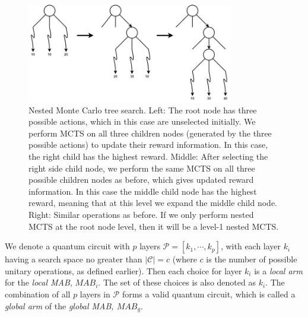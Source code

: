 \documentclass[a4paper,onecolumn,11pt]{quantumarticle}
\begin{document}
\begin{figure}[H]
  \centering
  \includegraphics[width=0.8\textwidth]{Figures/nmcs.png}
  \caption{Nested Monte Carlo tree search. Left: The root node has three possible actions, which in this case are unselected initially. We perform MCTS on all three children nodes (generated by the three possible actions) to update their reward information. In this case, the right child has the highest reward. Middle: After selecting the right side child node, we perform the same MCTS on all three possible children nodes as before, which gives updated reward information. In this case the middle child node has the highest reward, meaning that at this level we expand the middle child node. Right: Similar operations as before. If we only perform nested MCTS at the root node level, then it will be a level-1 nested MCTS.}
  \label{fig:nestedmcts}
\end{figure}



We denote a quantum circuit with $p$ layers $\mathcal{P} = [k_1,\cdots, k_p]$, with each layer $k_i$ having a search space no greater than $\vert \mathcal{C} \vert = c$ (where $c$ is the number of possible unitary operations, as defined earlier). Then each choice for layer $k_i$ is a \textit{local arm} for the \textit{local MAB}, $MAB_i$. The set of these choices is also denoted as $k_i$. The combination of all $p$ layers in $\mathcal{P}$ forms a valid quantum circuit, which is called a \textit{global arm} of the \textit{global MAB, $MAB_g$}. 
\end{document}
